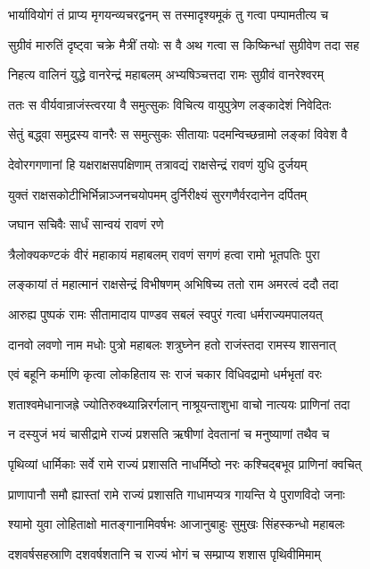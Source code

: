 \twolineshloka
{भार्यावियोगं तं प्राप्य मृगयन्व्यचरद्वनम्}
{स तस्मादृश्यमूकं तु गत्वा पम्पामतीत्य च}


\twolineshloka
{सुग्रीवं मारुतिं दृष्ट्वा चक्रे मैत्रीं तयोः स वै}
{अथ गत्वा स किष्किन्धां सुग्रीवेण तदा सह}


\twolineshloka
{निहत्य वालिनं युद्धे वानरेन्द्रं महाबलम्}
{अभ्यषिञ्चत्तदा रामः सुग्रीवं वानरेश्वरम्}


\twolineshloka
{ततः स वीर्यवान्राजंस्त्वरया वै समुत्सुकः}
{विचित्य वायुपुत्रेण लङ्कादेशं निवेदितः}


\twolineshloka
{सेतुं बद्ध्वा समुद्रस्य वानरैः स समुत्सुकः}
{सीतायाः पदमन्विच्छन्रामो लङ्कां विवेश वै}


\twolineshloka
{देवोरगगणानां हि यक्षराक्षसपक्षिणाम्}
{तत्रावद्यं राक्षसेन्द्रं रावणं युधि दुर्जयम्}


\twolineshloka
{युक्तं राक्षसकोटीभिर्भिन्नाञ्जनचयोपमम्}
{दुर्निरीक्ष्यं सुरगणैर्वरदानेन दर्पितम्}


\onelineshloka
{जघान सचिवैः सार्धं सान्वयं रावणं रणे}


\twolineshloka
{त्रैलोक्यकण्टकं वीरं महाकायं महाबलम्}
{रावणं सगणं हत्वा रामो भूतपतिः पुरा}


\twolineshloka
{लङ्कायां तं महात्मानं राक्षसेन्द्रं विभीषणम्}
{अभिषिच्य ततो राम अमरत्वं ददौ तदा}


\twolineshloka
{आरुह्य पुष्पकं रामः सीतामादाय पाण्डव}
{सबलं स्वपुरं गत्वा धर्मराज्यमपालयत्}


\twolineshloka
{दानवो लवणो नाम मधोः पुत्रो महाबलः}
{शत्रुघ्नेन हतो राजंस्तदा रामस्य शासनात्}


\twolineshloka
{एवं बहूनि कर्माणि कृत्वा लोकहिताय सः}
{राजं चकार विधिवद्रामो धर्मभृतां वरः}


\twolineshloka
{शताश्वमेधानाजह्रे ज्योतिरुक्थ्यान्निरर्गलान्}
{नाश्रूयन्ताशुभा वाचो नात्ययः प्राणिनां तदा}


\twolineshloka
{न दस्युजं भयं चासीद्रामे राज्यं प्रशसति}
{ऋषीणां देवतानां च मनुष्याणां तथैव च}


\twolineshloka
{पृथिव्यां धार्मिकाः सर्वे रामे राज्यं प्रशासति}
{नाधर्मिष्ठो नरः कश्चिद्बभूव प्राणिनां क्वचित्}


\twolineshloka
{प्राणापानौ समौ ह्यास्तां रामे राज्यं प्रशासति}
{गाधामप्यत्र गायन्ति ये पुराणविदो जनाः}


\twolineshloka
{श्यामो युवा लोहिताक्षो मातङ्गानामिवर्षभः}
{आजानुबाहुः सुमुखः सिंहस्कन्धो महाबलः}


\twolineshloka
{दशवर्षसहस्राणि दशवर्षशतानि च}
{राज्यं भोगं च सम्प्राप्य शशास पृथिवीमिमाम्}


